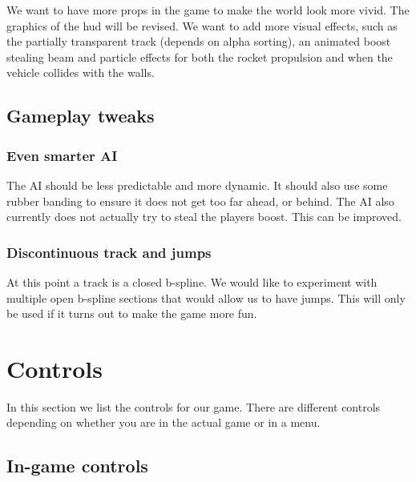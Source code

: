 \documentclass[11pt]{article}
\begin{document}
We want to have more props in the game to make the world look more vivid. The graphics of the hud will be revised. We want to add more visual effects, such as the partially transparent track (depends on alpha sorting), an animated boost stealing beam and particle effects for both the rocket propulsion and when the vehicle collides with the walls. 

\subsection{Gameplay tweaks}

\subsubsection{Even smarter AI}

The AI should be less predictable and more dynamic. It should also use some rubber banding to ensure it does not get too far ahead, or behind. The AI also currently does not actually try to steal the players boost. This can be improved.

\subsubsection{Discontinuous track and jumps}

At this point a track is a closed b-spline. We would like to experiment with multiple open b-spline sections that would allow us to have jumps. This will only be used if it turns out to make the game more fun.


\appendix

\section{Controls}
\label{controls}

In this section we list the controls for our game. There are different controls
depending on whether you are in the actual game or in a menu. 

\subsection{In-game controls}
\end{document}
